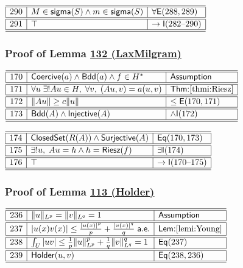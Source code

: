 \documentclass[11pt,reqno]{amsart}
\begin{document}
\medskip

\noindent$%
\begin{array}{|r|l|l|}
\hline\hline
290 & M\in\mathsf{sigma}(S)\wedge m\in\mathsf{sigma}(S) & \forall\mathsf{E}(288,289) \\ \hline\hline
291 & \top & \to\mathsf{I}(282\text{--}290) \\ \hline\hline
\end{array}%
$

\medskip

\subsubsection*{Proof of Lemma \hyperlink{lem:LaxMilgram}{132 (\textsf{LaxMilgram})}}

\noindent$%
\begin{array}{|r|l|l|}
\hline\hline
170 & \mathsf{Coercive}(a)\wedge\mathsf{Bdd}(a)\wedge f\in H^{*} & \textsf{Assumption} \\ \hline\hline
171 & \forall u\;\exists!Au\in H,\;\forall v,\;(Au,v)=a(u,v) & \textsf{Thm:}\ref{thmi:Riesz} \\ \hline\hline
172 & \|Au\|\ge c\|u\| & \le\mathsf{E}(170,171) \\ \hline\hline
173 & \mathsf{Bdd}(A)\wedge\mathsf{Injective}(A) & \land\mathsf{I}(172) \\ \hline\hline
\end{array}%
$

\medskip

\noindent$%
\begin{array}{|r|l|l|}
\hline\hline
174 & \mathsf{ClosedSet}(R(A))\wedge\mathsf{Surjective}(A) & \mathsf{Eq}(170,173) \\ \hline\hline
175 & \exists!u,\;Au=h\wedge h=\mathsf{Riesz}(f) & \exists\mathsf{I}(174) \\ \hline\hline
176 & \top & \to\mathsf{I}(170\text{--}175) \\ \hline\hline
\end{array}%
$

\medskip

\subsubsection*{Proof of Lemma \hyperlink{thm:Holder}{113 (\textsf{Holder})}}

\noindent$%
\begin{array}{|r|l|l|}
\hline\hline
236 & \|u\|_{L^{p}}=\|v\|_{L^{q}}=1 & \textsf{Assumption} \\ \hline\hline
237 & |u(x)v(x)|\le\tfrac{|u(x)|^{p}}{p}+\tfrac{|v(x)|^{q}}{q}\;\mathsf{a.e.} & \textsf{Lem:}\ref{lemi:Young} \\ \hline\hline
238 & \int_{U}|uv|\le\tfrac{1}{p}\|u\|_{L^{p}}^{p}+\tfrac{1}{q}\|v\|_{L^{q}}^{q}=1 & \mathsf{Eq}(237) \\ \hline\hline
239 & \mathsf{Holder}(u,v) & \mathsf{Eq}(238,236) \\ \hline\hline
\end{array}%
$
\end{document}
